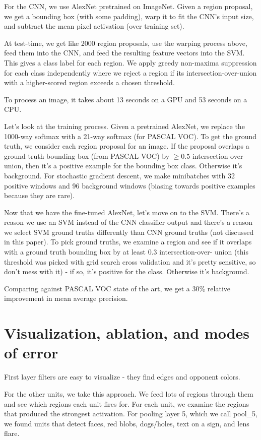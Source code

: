 \documentclass[a4paper]{article}
\begin{document}
For the CNN, we use AlexNet pretrained on ImageNet. Given a region proposal,
we get a bounding box (with some padding), warp it to fit the CNN's input size,
and subtract the mean pixel activation (over training set).

At test-time, we get like 2000 region proposals, use the warping process above,
feed them into the CNN, and feed the resulting feature vectors into the SVM.
This gives a class label for each region. We apply greedy non-maxima
suppression for each class independently where we reject a region if its
intersection-over-union with a higher-scored region exceeds a chosen threshold.

To process an image, it takes about 13 seconds on a GPU and 53 seconds on a CPU.

Let's look at the training process. Given a pretrained AlexNet, we replace the
1000-way softmax with a 21-way softmax (for PASCAL VOC). To get the ground
truth, we consider each region proposal for an image. If the proposal
overlaps a ground truth bounding box (from PASCAL VOC) by $\geq 0.5$
intersection-over-union, then it's a positive example for the bounding box
class. Otherwise it's background. For stochastic gradient descent, we make
minibatches with 32 positive windows and 96 background windows (biasing towards
positive examples because they are rare).

Now that we have the fine-tuned AlexNet, let's move on to the SVM. There's a
reason we use an SVM instead of the CNN classifier output and there's a reason
we select SVM ground truths differently than CNN ground truths (not discussed
in this paper). To pick ground truths, we examine a region and see if it
overlaps with a ground truth bounding box by at least 0.3 intersection-over-
union (this threshold was picked with grid search cross validation and it's
pretty sensitive, so don't mess with it) - if so, it's positive for the class.
Otherwise it's background.

Comparing against PASCAL VOC state of the art, we get a 30\% relative
improvement in mean average precision.

\section{Visualization, ablation, and modes of error}
First layer filters are easy to visualize - they find edges and opponent
colors.

For the other units, we take this approach. We feed lots of regions through
them and see which regions each unit fires for. For each unit, we examine
the regions that produced the strongest activation. For pooling layer 5,
which we call pool_5, we found units that detect faces, red blobs, dogs/holes,
text on a sign, and lens flare.
\end{document}
